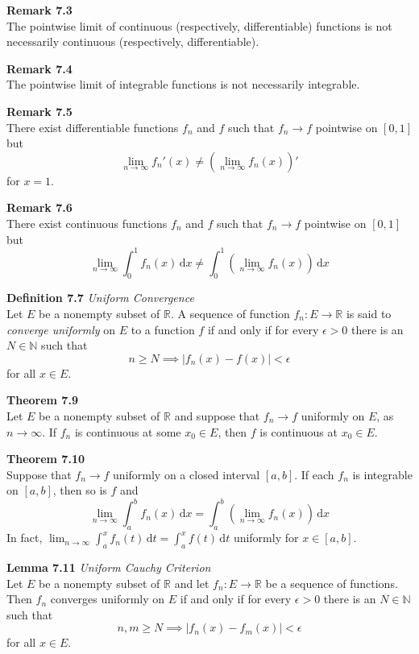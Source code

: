 \documentclass[8pt,landscape]{article}
\begin{document}
\begin{multicols}{3}
\textbf{Remark 7.3} \\
The pointwise limit of continuous (respectively, differentiable) functions is not
necessarily continuous (respectively, differentiable).

\textbf{Remark 7.4} \\
The pointwise limit of integrable functions is not necessarily integrable.

\textbf{Remark 7.5} \\
There exist differentiable functions $f_n$ and $f$ such that $f_n \to f$ pointwise
on $[0, 1]$ but
\[
    \lim_{n \to \infty} f_n'(x) \neq \left( \lim_{n \to \infty} f_n(x) \right)'
\]
for $x = 1$.

\textbf{Remark 7.6} \\
There exist continuous functions $f_n$ and $f$ such that $f_n \to f$ pointwise on
$[0, 1]$ but
\[
    \lim_{n \to \infty} \int_0^1 f_n(x) \, \mathrm{d}x \neq
    \int_0^1 \left( \lim_{n \to \infty} f_n(x) \right) \, \mathrm{d}x
\]

\textbf{Definition 7.7} \emph{Uniform Convergence} \\
Let $E$ be a nonempty subset of $\mathbb{R}$.
A sequence of function $f_n : E \to \mathbb{R}$ is said to \emph{converge uniformly}
on $E$ to a function $f$ if and only if for every $\epsilon > 0$ there is an
$N \in \mathbb{N}$ such that
\[
    n \geq N \implies |f_n(x) - f(x)| < \epsilon
\]
for all $x \in E$.

\textbf{Theorem 7.9} \\
Let $E$ be a nonempty subset of $\mathbb{R}$ and suppose that $f_n \to f$ uniformly
on $E$, as $n \to \infty$.
If $f_n$ is continuous at some $x_0 \in E$, then $f$ is continuous at $x_0 \in E$.

\textbf{Theorem 7.10} \\
Suppose that $f_n \to f$ uniformly on a closed interval $[a, b]$.
If each $f_n$ is integrable on $[a, b]$, then so is $f$ and
\[
    \lim_{n \to \infty} \int_a^b f_n(x)\, \mathrm{d}x =
    \int_a^b \left( \lim_{n \to \infty} f_n(x)\right)\, \mathrm{d}x
\]
In fact, $\lim_{n \to \infty} \int_a^x f_n(t)\, \mathrm{d}t =
\int_a^x f(t)\, \mathrm{d}t$ uniformly for $x \in [a, b]$.

\textbf{Lemma 7.11} \emph{Uniform Cauchy Criterion} \\
Let $E$ be a nonempty subset of $\mathbb{R}$ and let $f_n : E \to \mathbb{R}$ be
a sequence of functions.
Then $f_n$ converges uniformly on $E$ if and only if for every $\epsilon > 0$
there is an $N \in \mathbb{N}$ such that
\[
    n, m \geq N \implies |f_n(x) - f_m(x)| < \epsilon
\]
for all $x \in E$.


\end{multicols}
\end{document}

